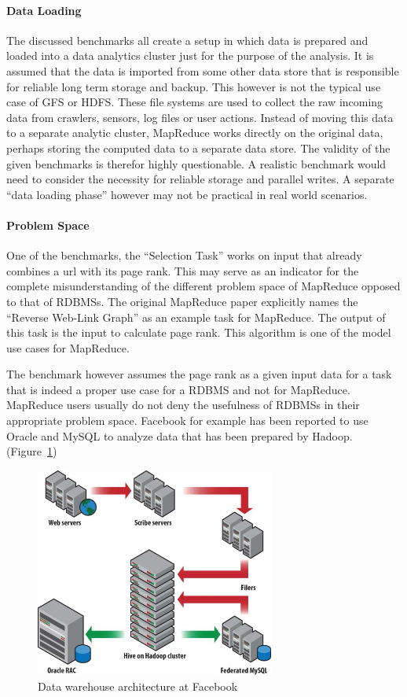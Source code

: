 \documentclass[12pt,a4paper]{scrartcl}		%
\begin{document}
\paragraph{Data Loading}
The discussed benchmarks all create a setup in which data is prepared and loaded into a data analytics cluster just for the purpose of the analysis. It is assumed that the data is imported from some other data store that is responsible for reliable long term storage and backup.
This however is not the typical use case of GFS or HDFS. These file systems are used to collect the raw incoming data from crawlers, sensors, log files or user actions. Instead of moving this data to a separate analytic cluster, MapReduce works directly on the original data, perhaps storing the computed data to a separate data store.
The validity of the given benchmarks is therefor highly questionable. A realistic benchmark would need to consider the necessity for reliable storage and parallel writes. A separate ``data loading phase'' however may not be practical in real world scenarios.

\paragraph{Problem Space}
One of the benchmarks, the ``Selection Task'' works on input that already combines a url with its page rank. This may serve as an indicator for the complete misunderstanding of the different problem space of MapReduce opposed to that of RDBMSs. The original MapReduce paper explicitly names the ``Reverse Web-Link Graph'' as an example task for MapReduce. The output of this task is the input to calculate page rank. This algorithm is one of the model use cases for MapReduce.

The benchmark however assumes the page rank as a given input data for a task that is indeed a proper use case for a RDBMS and not for MapReduce. MapReduce users usually do not deny the usefulness of RDBMSs in their appropriate problem space. Facebook for example has been reported to use Oracle and MySQL to analyze data that has been prepared by Hadoop. (Figure~\ref{fig:facebookdatawarehouse})

\begin{figure}[t]
  \centering
  \includegraphics[width=0.7\textwidth]{images/rdms_as_frontend.jpg}
  \caption{Data warehouse architecture at Facebook\cite[p. 508]{White201010}}
  \label{fig:facebookdatawarehouse}
\end{figure}
\end{document}
